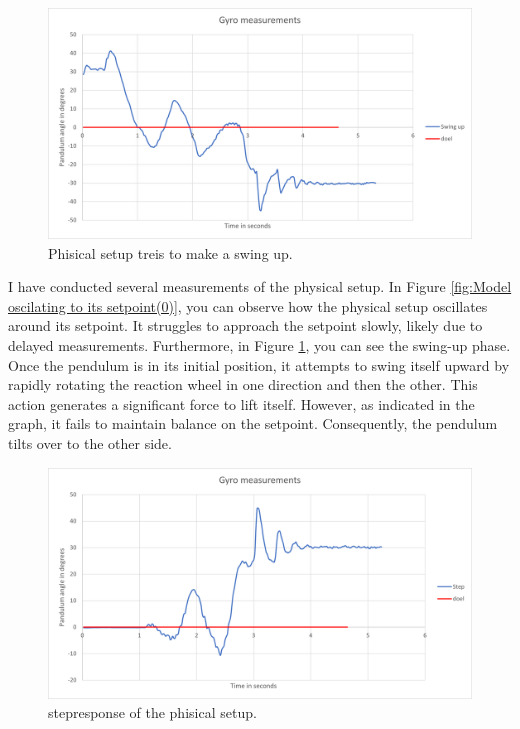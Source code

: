 \documentclass{article}
\begin{document}
\begin{multicols}{2}
\begin{figure}[H]
\centering
\includegraphics[scale=0.37]{Swing Up}
\caption{Phisical setup treis to make a swing up.}
\label{fig:swing up}
\end{figure}

I have conducted several measurements of the physical setup. In Figure \ref{fig:Model oscilating to its setpoint(0)}, you can observe how the physical setup oscillates around its setpoint. It struggles to approach the setpoint slowly, likely due to delayed measurements. Furthermore, in Figure \ref{fig:swing up}, you can see the swing-up phase. Once the pendulum is in its initial position, it attempts to swing itself upward by rapidly rotating the reaction wheel in one direction and then the other. This action generates a significant force to lift itself. However, as indicated in the graph, it fails to maintain balance on the setpoint. Consequently, the pendulum tilts over to the other side.

\begin{figure}[H]
\centering
\includegraphics[scale=0.37]{Model stepresponse}
\caption{stepresponse of the phisical setup.}
\label{fig:stepresponse of the model}
\end{figure}


\end{multicols}
\end{document}
